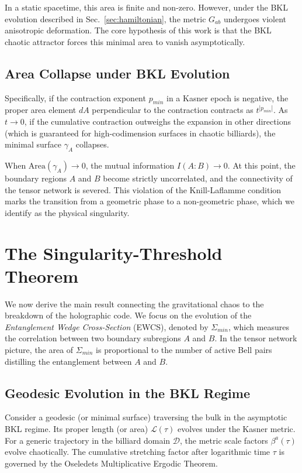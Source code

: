 \documentclass[aps,prd,reprint,nofootinbib,amsmath,amssymb,amsfonts]{revtex4-2}
\begin{document}
In a static spacetime, this area is finite and non-zero. However, under the BKL evolution described in Sec.~\ref{sec:hamiltonian}, the metric $G_{ab}$ undergoes violent anisotropic deformation. The core hypothesis of this work is that the BKL chaotic attractor forces this minimal area to vanish asymptotically.

\subsection{Area Collapse under BKL Evolution}

Specifically, if the contraction exponent $p_{min}$ in a Kasner epoch is negative, the proper area element $dA$ perpendicular to the contraction contracts as $t^{|p_{min}|}$. As $t \to 0$, if the cumulative contraction outweighs the expansion in other directions (which is guaranteed for high-codimension surfaces in chaotic billiards), the minimal surface $\gamma_A$ collapses.

When $\text{Area}(\gamma_A) \to 0$, the mutual information $I(A:B) \to 0$. At this point, the boundary regions $A$ and $B$ become strictly uncorrelated, and the connectivity of the tensor network is severed. This violation of the Knill-Laflamme condition marks the transition from a geometric phase to a non-geometric phase, which we identify as the physical singularity.

\section{The Singularity-Threshold Theorem}
\label{sec:theorem}

We now derive the main result connecting the gravitational chaos to the breakdown of the holographic code. We focus on the evolution of the \textit{Entanglement Wedge Cross-Section} (EWCS), denoted by $\Sigma_{min}$, which measures the correlation between two boundary subregions $A$ and $B$. In the tensor network picture, the area of $\Sigma_{min}$ is proportional to the number of active Bell pairs distilling the entanglement between $A$ and $B$.

\subsection{Geodesic Evolution in the BKL Regime}

Consider a geodesic (or minimal surface) traversing the bulk in the asymptotic BKL regime. Its proper length (or area) $\mathcal{L}(\tau)$ evolves under the Kasner metric. For a generic trajectory in the billiard domain $\mathcal{D}$, the metric scale factors $\beta^a(\tau)$ evolve chaotically. The cumulative stretching factor after logarithmic time $\tau$ is governed by the Oseledets Multiplicative Ergodic Theorem.
\end{document}

